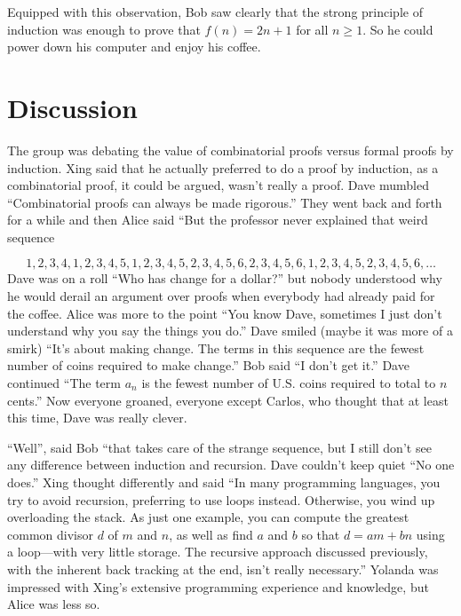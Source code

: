 Equipped with this observation, Bob saw clearly that the strong principle
of induction was enough to prove that $f(n)=2n+1$ for all $n\ge1$.
So he could power down his computer and enjoy his coffee.

\section{Discussion}\label{s:induction:discussion}
 
The group was debating the value of combinatorial proofs versus
formal proofs by induction.  Xing said that he actually preferred to
do a proof by induction, as a combinatorial proof, it could be
argued, wasn't really a proof.  Dave mumbled ``Combinatorial proofs
can always be made rigorous.''   They went back and forth for a
while and then Alice said ``But the professor never explained
that weird sequence

\[
1,2,3,4,1,2,3,4,5,1,2,3,4,5,2,3,4,5,6,2,3,4,5,6,1,2,3,4,5,2,3,4,5,6,\dots
\]
Dave was on a roll ``Who has change for a dollar?'' but nobody
understood why he would derail an argument over proofs when
everybody had already paid for the coffee.  Alice was more to the
point ``You know Dave, sometimes I just don't understand why
you say  the things you do.''  Dave smiled (maybe it was more of
a smirk) ``It's about making change.  The terms in this sequence
are the fewest number of coins required to make change.''
Bob said ``I don't get it.'' Dave continued ``The term  $a_n$ is
the fewest number of U.S. coins required to total to $n$ cents.''
Now everyone groaned, everyone except Carlos, who thought that
at least this time, Dave was really clever.

``Well'', said Bob ``that takes care of the strange sequence,
but I still don't see any difference between
induction and recursion.  Dave couldn't keep quiet ``No one does.''  Xing thought
differently and said ``In many programming languages, you try to
avoid recursion, preferring to use loops instead.  Otherwise, you
wind up overloading the stack.  As just one example, you can
compute the greatest common divisor $d$ of $m$ and $n$, as well as
find $a$ and $b$ so that $d=am+bn$ using a loop---with very
little storage.  The recursive approach discussed previously, with 
the inherent back tracking at the end, isn't really necessary.''  
Yolanda was impressed with Xing's extensive programming experience and 
knowledge, but Alice was less so.  

